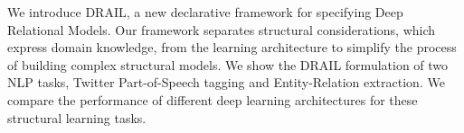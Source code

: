 We introduce DRAIL, a new declarative framework for specifying Deep Relational Models. Our framework separates structural considerations, which express domain knowledge, from the learning architecture to simplify the process of building complex structural models. We show the DRAIL formulation of two NLP tasks, Twitter Part-of-Speech tagging and Entity-Relation extraction. We compare the performance of different deep learning architectures for these structural learning tasks.
